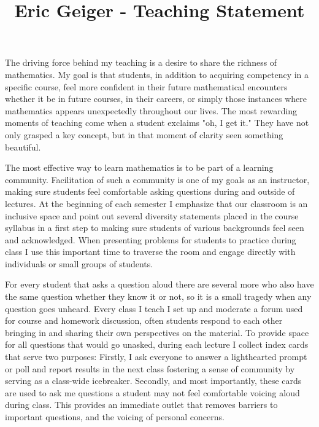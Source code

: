 \documentclass{article}[12pt]
\title{Eric Geiger - Teaching Statement}
\date{}
\begin{document}
\maketitle

The driving force behind my teaching is a desire to share the richness of mathematics.
My goal is that students, in addition to acquiring competency in a specific course, feel more confident in their future mathematical encounters whether it be in future courses, in their careers, or simply those instances where mathematics appears unexpectedly throughout our lives.
The most rewarding moments of teaching come when a student exclaims "oh, I get it." They have not only grasped a key concept, but in that moment of clarity seen something beautiful.

The most effective way to learn mathematics is to be part of a learning community.
Facilitation of such a community is one of my goals as an instructor,
making sure students feel comfortable asking questions during and outside of lectures.
At the beginning of each semester I emphasize that our classroom is an inclusive space and point out several diversity statements placed in the course syllabus in a first step to making sure students of various backgrounds feel seen and acknowledged.
When presenting problems for students to practice during class I use this important time to traverse the room and engage directly with individuals or small groups of students.

For every student that asks a question aloud there are several more who also have the same question whether they know it or not, so it is a small tragedy when any question goes unheard.
Every class I teach I set up and moderate a forum used for course and homework discussion, often students respond to each other bringing in and sharing their own perspectives on the material.
To provide space for all questions that would go unasked, during each lecture I collect index cards that serve two purposes:
Firstly, I ask everyone to answer a lighthearted prompt or poll and report results in the next class fostering a sense of community by serving as a class-wide icebreaker.
Secondly, and most importantly, these cards are used to ask me questions a student may not feel comfortable voicing aloud during class. This provides an immediate outlet that removes barriers to important questions, and the voicing of personal concerns.
\end{document}
